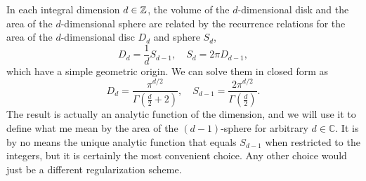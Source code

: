 \documentclass[12pt]{article}
\begin{document}
In each integral dimension $d\in \mathbb{Z}$, the volume of the
$d$-dimensional disk and the area of the $d$-dimensional sphere are
related by the recurrence relations for the area of the
$d$-dimensional disc $D_d$ and sphere $S_d$,
\begin{equation}
  D_d = \frac{1}{d} S_{d-1}
  ,\quad
  S_d = 2\pi D_{d-1},
\end{equation}
which have a simple geometric origin. We can solve them in closed form
as
\begin{equation}
  D_d = \frac{\pi^{d/2}}{\Gamma(\frac{d}{2}+2)}
  ,\quad
  S_{d-1} = \frac{2 \pi^{d/2}}{\Gamma(\frac{d}{2})}.
\end{equation}
The result is actually an analytic function of the dimension, and we
will use it to define what me mean by the area of the $(d-1)$-sphere
for arbitrary $d\in\mathbb{C}$. It is by no means the unique analytic
function that equals $S_{d-1}$ when restricted to the integers, but it
is certainly the most convenient choice. Any other choice would just
be a different regularization scheme.
\end{document}
